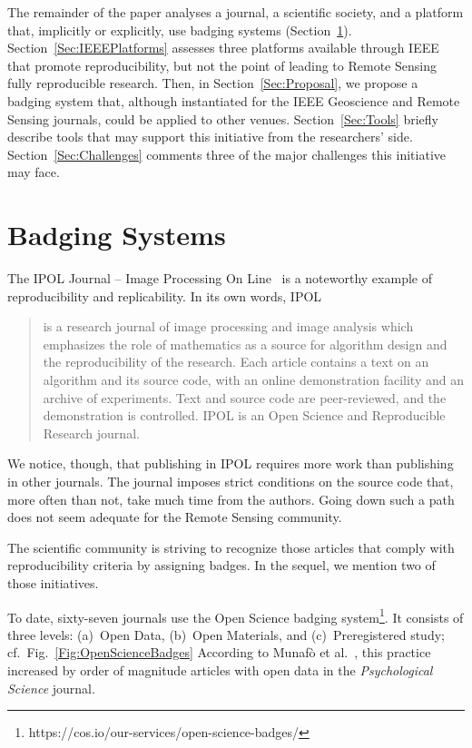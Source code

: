 \documentclass[journal,twoside]{IEEEtran}
\begin{document}
The remainder of the paper analyses a journal, a scientific society, and a platform that, implicitly or explicitly, use badging systems (Section~\ref{Sec:BadgingSystems}).
Section~\ref{Sec:IEEEPlatforms} assesses three platforms available through IEEE that promote reproducibility, but not the point of leading to Remote Sensing fully reproducible research.
Then, in Section~\ref{Sec:Proposal}, we propose a badging system that, although instantiated for the IEEE Geoscience and Remote Sensing journals, could be applied to other venues.
Section~\ref{Sec:Tools} briefly describe tools that may support this initiative from the researchers' side.
Section~\ref{Sec:Challenges} comments three of the major challenges this initiative may face.

\section{Badging Systems}\label{Sec:BadgingSystems}

The IPOL Journal -- Image Processing On Line~\cite{IPOL} is a noteworthy example of reproducibility and replicability.
In its own words, IPOL
\begin{quote}
	is a research journal of image processing and image analysis which emphasizes the role of mathematics as a source for algorithm design and the reproducibility of the research. Each article contains a text on an algorithm and its source code, with an online demonstration facility and an archive of experiments. Text and source code are peer-reviewed, and the demonstration is controlled. IPOL is an Open Science and Reproducible Research journal.
\end{quote}

We notice, though, that publishing in IPOL requires more work than publishing in other journals. 
The journal imposes strict conditions on the source code that, more often than not, take much time from the authors.
Going down such a path does not seem adequate for the Remote Sensing community.

The scientific community is striving to recognize those articles that comply with reproducibility criteria by assigning badges.
In the sequel, we mention two of those initiatives.

To date, sixty-seven journals use the Open Science badging system\footnote{https://cos.io/our-services/open-science-badges/}.
It consists of three levels: (a)~Open Data, (b)~Open Materials, and (c)~Preregistered study; cf.\
Fig.~\ref{Fig:OpenScienceBadges}
According to Munaf\`o et al.~\cite{ManifestoReproducibleScience}, this practice increased by order of magnitude articles with open data in the \textit{Psychological Science} journal.
\end{document}
